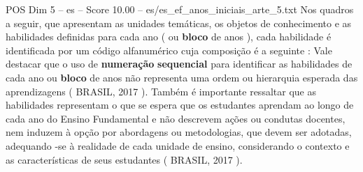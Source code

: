 \begin{textsample}{POS Dim 5 – es – Score 10.00 – es/es\_ef\_anos\_iniciais\_arte\_5.txt}
Nos quadros a seguir, que apresentam as unidades temáticas, os objetos de conhecimento e as habilidades definidas para cada ano ( ou \textbf{bloco} de anos ), cada habilidade é identificada por um código alfanumérico cuja composição é a seguinte : Vale destacar que o uso de \textbf{numeração} \textbf{sequencial} para identificar as habilidades de cada ano ou \textbf{bloco} de anos não representa uma ordem ou hierarquia esperada das aprendizagens ( BRASIL, 2017 ).
Também é importante ressaltar que as habilidades representam o que se espera que os estudantes aprendam ao longo de cada ano do Ensino Fundamental e não descrevem ações ou condutas docentes, nem induzem à opção por abordagens ou metodologias, que devem ser adotadas, adequando -se à realidade de cada unidade de ensino, considerando o contexto e as características de seus estudantes ( BRASIL, 2017 ).

\end{textsample}
